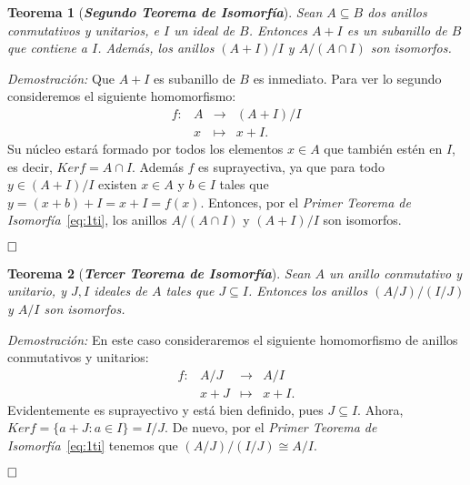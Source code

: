\documentclass[12pt]{article}
\newtheorem{theorem}{Teorema}[section]
\begin{document}
\begin{theorem}[\textbf{\textit{Segundo Teorema de Isomorfía}}]
Sean $A \subseteq B$ dos anillos conmutativos y unitarios, e $I$ un ideal de $B$. Entonces $A + I$ es un subanillo de $B$ que contiene a $I$. Además, los anillos $(A+ I)/I$ y $A/(A \cap I)$ son isomorfos.
\end{theorem}
\emph{Demostración: } Que $A + I$ es subanillo de $B$ es inmediato. Para ver lo segundo consideremos el siguiente homomorfismo: $$\begin{array}{rccl}
f \colon &A&\longrightarrow &(A + I)/I \\
&x& \longmapsto &x + I.
\end{array}
$$ Su núcleo estará formado por todos los elementos $x \in A$ que también estén en $I$, es decir, $Ker f = A \cap I$. Además $f$ es suprayectiva, ya que para todo $y \in (A+ I)/I$ existen $x \in A$ y $b \in I$ tales que $y = (x +b) + I = x + I = f(x)$. Entonces, por el \textit{Primer Teorema de Isomorfía}~\ref{eq:1ti}, los anillos $A/(A \cap I)$ y $(A+I)/I$ son isomorfos.

$\hfill \square$

\begin{theorem}[\textbf{\textit{Tercer Teorema de Isomorfía}}]
Sean $A$ un anillo conmutativo y unitario, y $J, I$ ideales de $A$ tales que $J \subseteq I$. Entonces los anillos $(A/J)/(I/J)$ y $A/I$ son isomorfos.
\end{theorem}
\emph{Demostración: }En este caso consideraremos el siguiente homomorfismo de anillos conmutativos y unitarios: $$\begin{array}{rccl}
f \colon &A/J&\longrightarrow &A/I \\
&x+ J& \longmapsto &x + I.
\end{array}
$$ Evidentemente es suprayectivo y está bien definido, pues $J \subseteq I$. Ahora, $Ker f = \lbrace a + J: a \in I \rbrace = I/J$. De nuevo, por el \textit{Primer Teorema de Isomorfía}~\ref{eq:1ti} tenemos que $(A/J)/(I/J) \cong A/I$.

$\hfill \square$
\end{document}
